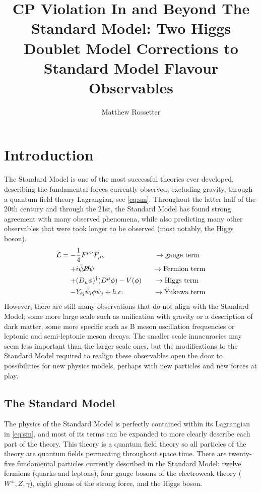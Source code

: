 \documentclass[a4paper,12pt]{article}
\title{CP Violation In and Beyond The Standard Model: Two Higgs Doublet Model Corrections to Standard Model Flavour Observables}
\author{Matthew Rossetter}
\affiliation{Supervised By Alexander Lenz}
\affiliation{MPhys Theoretical Physics, Durham University}
\begin{document}
 
\maketitle
\flushbottom

\section{Introduction}
The Standard Model is one of the most successful theories ever developed, describing the fundamental forces currently observed, excluding gravity, through a quantum field theory Lagrangian, see \eqref{eq:sm}.
Throughout the latter half of the 20th century and through the 21st, the Standard Model has found strong agreement with many observed phenomena, while also predicting many other observables that were took longer to be observed (most notably, the Higgs boson).
\begin{equation}
    \label{eq:sm}
    \begin{split}
        \mathcal{L} = -&\frac14 F^{\mu\nu}F_{\mu\nu} \qquad\qquad\qquad\quad\to \text{gauge term}\\
                      +& i\bar{\psi}\cancel{D}\psi \qquad\qquad\qquad\qquad\;\to \text{Fermion term} \\
                      +& (D_\mu\phi)^\dagger(D^\mu\phi) - V(\phi) \quad\;\;\,\to \text{Higgs term}\\
                      -& Y_{ij}\bar{\psi}_i\phi\psi_j + h.c. \qquad\qquad\;\to\text{Yukawa term}
    \end{split}
\end{equation}
However, there are still many observations that do not align with the Standard Model; some more large scale such as unification with gravity or a description of dark matter, some more specific such as B meson oscillation frequencies or leptonic and semi-leptonic meson decays.
The smaller scale innacuracies may seem less important than the larger scale ones, but the modifications to the Standard Model required to realign these observables open the door to possibilities for new physics models, perhaps with new particles and new forces at play.

\subsection{The Standard Model}
The physics of the Standard Model is perfectly contained within its Lagrangian in \eqref{eq:sm}, and most of its terms can be expanded to more clearly describe each part of the theory. 
This theory is a quantum field theory so all particles of the theory are quantum fields permeating throughout space time. 
There are twenty-five fundamental particles currently described in the Standard Model: twelve fermions (quarks and leptons), four gauge bosons of the electroweak theory ($W^\pm,Z,\gamma$), eight gluons of the strong force, and the Higgs boson.
\end{document}
